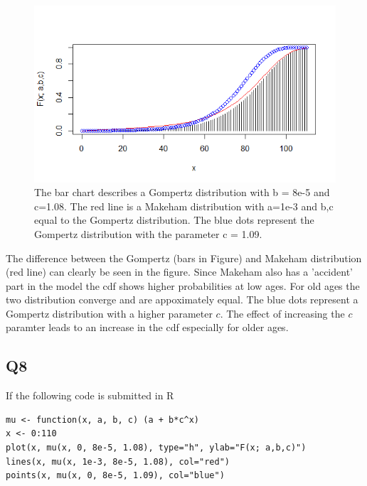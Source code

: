 \begin{center}
\begin{figure}

\includegraphics[scale=1]{Question_7_MakehamGompertz.png}

\caption{The bar chart describes a Gompertz distribution with b = 8e-5 and c=1.08. The red line is a 
Makeham distribution with a=1e-3 and b,c equal to the Gompertz distribution. The blue dots represent
the Gompertz distribution with the parameter c = 1.09.}
\label{Figure_Question7}

\end{figure}
\end{center}

The difference between the Gompertz (bars in Figure) and Makeham distribution (red line) can clearly be seen in the figure. Since Makeham also has a 'accident' part in the model the cdf shows higher probabilities at low ages. For old ages the two distribution converge and are appoximately equal. The blue dots represent a Gompertz distribution with a higher parameter $c$. The effect of increasing the $c$ paramter leads to an increase in the cdf especially for older ages.


\subsection*{Q8}

If the following code is submitted in R

\begin{verbatim}
mu <- function(x, a, b, c) (a + b*c^x)
x <- 0:110
plot(x, mu(x, 0, 8e-5, 1.08), type="h", ylab="F(x; a,b,c)")
lines(x, mu(x, 1e-3, 8e-5, 1.08), col="red")
points(x, mu(x, 0, 8e-5, 1.09), col="blue")
\end{verbatim}

